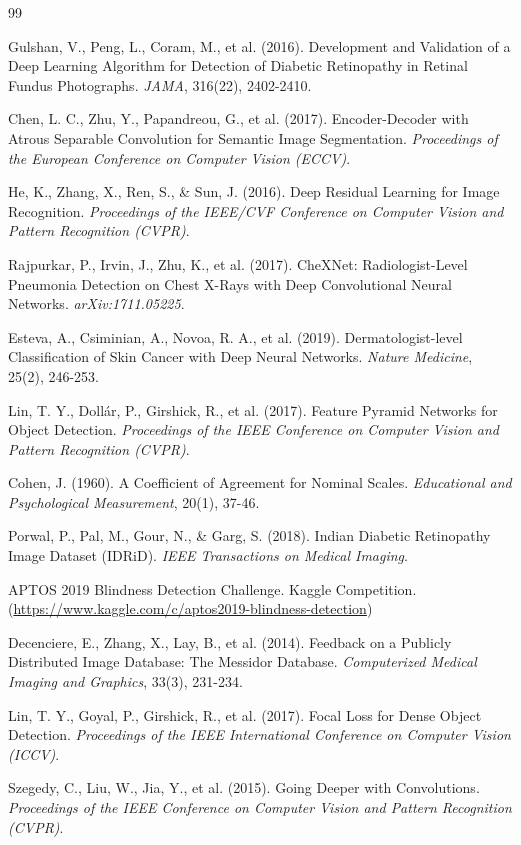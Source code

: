 \begin{thebibliography}{99}

 Gulshan, V., Peng, L., Coram, M., et al. (2016). Development and Validation of a Deep Learning Algorithm for Detection of Diabetic Retinopathy in Retinal Fundus Photographs. \emph{JAMA}, 316(22), 2402-2410.

 Chen, L. C., Zhu, Y., Papandreou, G., et al. (2017). Encoder-Decoder with Atrous Separable Convolution for Semantic Image Segmentation. \emph{Proceedings of the European Conference on Computer Vision (ECCV)}.

 He, K., Zhang, X., Ren, S., \& Sun, J. (2016). Deep Residual Learning for Image Recognition. \emph{Proceedings of the IEEE/CVF Conference on Computer Vision and Pattern Recognition (CVPR)}.

 Rajpurkar, P., Irvin, J., Zhu, K., et al. (2017). CheXNet: Radiologist-Level Pneumonia Detection on Chest X-Rays with Deep Convolutional Neural Networks. \emph{arXiv:1711.05225}.

 Esteva, A., Csiminian, A., Novoa, R. A., et al. (2019). Dermatologist-level Classification of Skin Cancer with Deep Neural Networks. \emph{Nature Medicine}, 25(2), 246-253.

 Lin, T. Y., Dollár, P., Girshick, R., et al. (2017). Feature Pyramid Networks for Object Detection. \emph{Proceedings of the IEEE Conference on Computer Vision and Pattern Recognition (CVPR)}.

 Cohen, J. (1960). A Coefficient of Agreement for Nominal Scales. \emph{Educational and Psychological Measurement}, 20(1), 37-46.

 Porwal, P., Pal, M., Gour, N., \& Garg, S. (2018). Indian Diabetic Retinopathy Image Dataset (IDRiD). \emph{IEEE Transactions on Medical Imaging}.

 APTOS 2019 Blindness Detection Challenge. Kaggle Competition. (\url{https://www.kaggle.com/c/aptos2019-blindness-detection})

 Decenciere, E., Zhang, X., Lay, B., et al. (2014). Feedback on a Publicly Distributed Image Database: The Messidor Database. \emph{Computerized Medical Imaging and Graphics}, 33(3), 231-234.

 Lin, T. Y., Goyal, P., Girshick, R., et al. (2017). Focal Loss for Dense Object Detection. \emph{Proceedings of the IEEE International Conference on Computer Vision (ICCV)}.

 Szegedy, C., Liu, W., Jia, Y., et al. (2015). Going Deeper with Convolutions. \emph{Proceedings of the IEEE Conference on Computer Vision and Pattern Recognition (CVPR)}.

\end{thebibliography}


